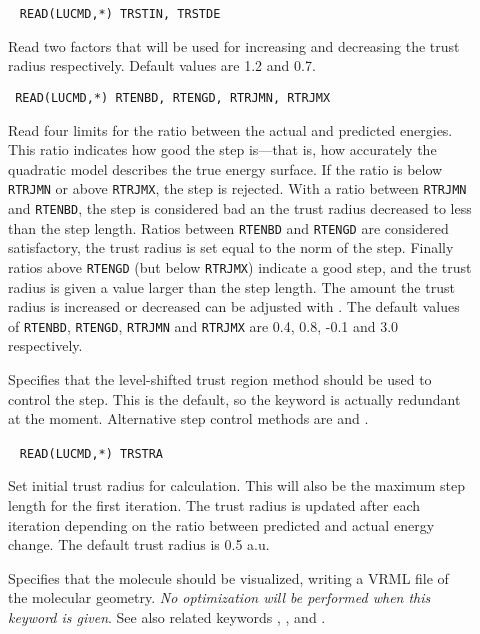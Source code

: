 \begin{description}
\item[]\verb| |
\newline
\verb|READ(LUCMD,*) TRSTIN, TRSTDE|

Read two factors that will be used for increasing and decreasing the
trust radius respectively. Default values are
1.2 and 0.7.

\item[]\verb| |
\newline
\verb|READ(LUCMD,*) RTENBD, RTENGD, RTRJMN, RTRJMX|

Read four limits for the ratio between the actual and predicted
energies. This ratio indicates how good the step is---that is, how
accurately the quadratic model describes the true energy
surface. If the ratio is below \verb|RTRJMN| or above
\verb|RTRJMX|, the step is rejected. With a ratio between
\verb|RTRJMN| and \verb|RTENBD|, the step is considered bad an the
trust radius decreased to less than the step
length. Ratios between \verb|RTENBD| and \verb|RTENGD| are
considered satisfactory, the trust radius is set equal to the norm
of the step. Finally ratios above \verb|RTENGD| (but below
\verb|RTRJMX|) indicate a good step, and the trust radius is given
a value larger than the step length. The amount the trust radius
is increased or decreased can be adjusted with . The
default values of \verb|RTENBD|, \verb|RTENGD|, \verb|RTRJMN| and
\verb|RTRJMX| are 0.4, 0.8, -0.1 and 3.0 respectively.

\item[]
Specifies that the level-shifted trust region method should be used to
control the step. This is the default, so the keyword is actually
redundant at the moment. Alternative step control methods are 
and .

\item[]\verb| |
\newline
\verb|READ(LUCMD,*) TRSTRA|

Set initial trust radius for calculation. This
will also be the
maximum step length for the first iteration. The trust radius is
updated after each iteration depending on the ratio between predicted
and actual energy change. The default trust radius is 0.5 a.u.

\item[]
Specifies that the molecule should be
visualized,
writing a VRML file of the molecular geometry. {\em{No optimization
will be performed when this keyword is given}}. See also related
keywords , ,  and .


\end{description}
